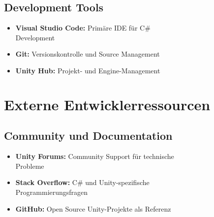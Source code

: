 \subsection{Development Tools}
\begin{itemize}
    \item \textbf{Visual Studio Code:} Primäre IDE für C\# \\
          Development
    \item \textbf{Git:} Versionskontrolle und Source Management
    \item \textbf{Unity Hub:} Projekt- und Engine-Management
\end{itemize}

\section{Externe Entwicklerressourcen}

\subsection{Community und Documentation}
\begin{itemize}
    \item \textbf{Unity Forums:} Community Support für technische \\
          Probleme
    \item \textbf{Stack Overflow:} C\# und Unity-spezifische \\
          Programmierungsfragen
    \item \textbf{GitHub:} Open Source Unity-Projekte als Referenz
\end{itemize}
